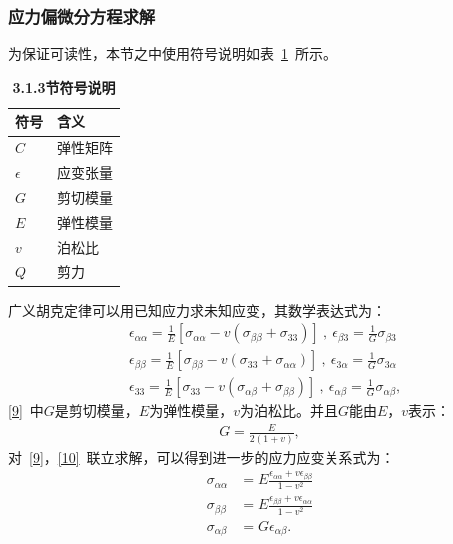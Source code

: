 \documentclass[withoutpreface,bwprint]{cumcmthesis} %
\begin{document}
\subsubsection{应力偏微分方程求解}
为保证可读性，本节之中使用符号说明如表~\ref{table-3}~所示。
\begin{table}[H]
	\caption{\textbf{3.1.3节符号说明}}%
	\centering
	\begin{tabular}{ll}%
		\hline %
		符号   &  含义  \\
		\hline %
		$C$&弹性矩阵\\
		$\epsilon$&应变张量\\
		$G$&剪切模量\\
		$E$&弹性模量\\
		$v$&泊松比\\
		$Q$&剪力\\
		\hline %
	\end{tabular} \label{table-3}
\end{table}
广义胡克定律可以用已知应力求未知应变，其数学表达式为：
\begin{equation}
    \begin{aligned}
     &\epsilon_{\alpha\alpha}=\frac{1}{E}\left[\sigma_{\alpha\alpha}-v\left(\sigma_{\beta\beta}+\sigma_{33}\right)\right]~,~\epsilon_{\beta3}=\frac{1}{G}\sigma_{\beta3}\\
     &\epsilon_{\beta\beta}=\frac{1}{E}\left[\sigma_{\beta\beta}-v\left(\sigma_{33}+\sigma_{\alpha\alpha}\right)\right]~,~\epsilon_{3\alpha}=\frac{1}{G}\sigma_{3\alpha}\\
     &\epsilon_{33}=\frac{1}{E}\left[\sigma_{33}-v\left(\sigma_{\alpha\beta}+\sigma_{\beta\beta}\right)\right]~,~\epsilon_{\alpha\beta}=\frac{1}{G}\sigma_{\alpha\beta},
    \end{aligned} \label{9}
\end{equation}
\eqref{9}~中$G$是剪切模量，$E$为弹性模量，$v$为泊松比。并且$G$能由$E$，$v$表示：
\begin{equation}
\begin{aligned}
    G=\frac{E}{2(1+v)}, \label{10}
\end{aligned}    
\end{equation}
对~\eqref{9}，\eqref{10}~联立求解，可以得到进一步的应力应变关系式为：
\begin{equation}
    \begin{aligned}
        \sigma_{\alpha\alpha}&=E\frac{\epsilon_{\alpha\alpha}+v\epsilon_{\beta\beta}}{1-v^2}\\
        \sigma_{\beta\beta}&=E\frac{\epsilon_{\beta\beta}+v\epsilon_{\alpha\alpha}}{1-v^2}\\
        \sigma_{\alpha\beta}&=G\epsilon_{\alpha\beta}.
    \end{aligned}\label{11}
\end{equation}
\end{document}
